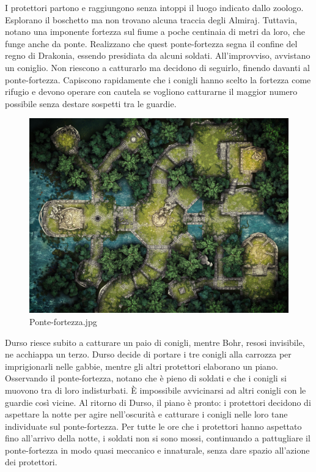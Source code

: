 I protettori partono e raggiungono senza intoppi il luogo indicato dallo
zoologo. Esplorano il boschetto ma non trovano alcuna traccia degli
Almiraj. Tuttavia, notano una imponente fortezza sul fiume a poche
centinaia di metri da loro, che funge anche da ponte. Realizzano che
quest ponte-fortezza segna il confine del regno di Drakonia, essendo
presidiata da alcuni soldati. All'improvviso, avvistano un coniglio. Non
riescono a catturarlo ma decidono di seguirlo, finendo davanti al
ponte-fortezza. Capiscono rapidamente che i conigli hanno scelto la
fortezza come rifugio e devono operare con cautela se vogliono
catturarne il maggior numero possibile senza destare sospetti tra le
guardie.

\begin{figure}
\centering
\includegraphics{Ponte-fortezza.jpg}
\caption{Ponte-fortezza.jpg}
\end{figure}

Durso riesce subito a catturare un paio di conigli, mentre Bohr, resosi
invisibile, ne acchiappa un terzo. Durso decide di portare i tre conigli
alla carrozza per imprigionarli nelle gabbie, mentre gli altri
protettori elaborano un piano. Osservando il ponte-fortezza, notano che
è pieno di soldati e che i conigli si muovono tra di loro indisturbati.
È impossibile avvicinarsi ad altri conigli con le guardie così vicine.
Al ritorno di Durso, il piano è pronto: i protettori decidono di
aspettare la notte per agire nell'oscurità e catturare i conigli nelle
loro tane individuate sul ponte-fortezza. Per tutte le ore che i
protettori hanno aspettato fino all'arrivo della notte, i soldati non si
sono mossi, continuando a pattugliare il ponte-fortezza in modo quasi
meccanico e innaturale, senza dare spazio all'azione dei protettori.

